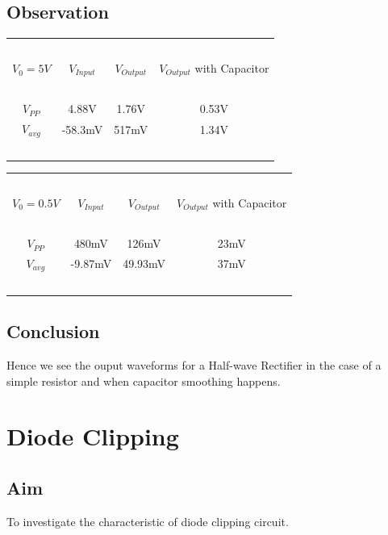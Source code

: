\documentclass{article}
\begin{document}
\subsection{Observation}
\vspace{5px}
\begin{center}
\begin{tabular}{| c | c | c | c |} 
 \hline
    \ & \ & \ & \ \\
    $V_0=5V$ &$V_{Input}$ & $V_{Output}$ & $V_{Output}$ with Capacitor \\ [1em]
    \hline
    \ & \ & \ & \ \\
    $V_{PP}$ & 4.88V & 1.76V & 0.53V \\
    $V_{avg}$ & -58.3mV & 517mV & 1.34V \\
    \ & \ & \ & \ \\
 \hline
\end{tabular}
\end{center}
\vspace{5px}
\begin{center}
\begin{tabular}{| c | c | c | c |} 
 \hline
    \ & \ & \ & \ \\
    $V_0=0.5V$ &$V_{Input}$ & $V_{Output}$ & $V_{Output}$ with Capacitor \\ [1em]
    \hline
    \ & \ & \ & \ \\
    $V_{PP}$ & 480mV & 126mV & 23mV \\
    $V_{avg}$ & -9.87mV & 49.93mV & 37mV \\
    \ & \ & \ & \ \\
 \hline
\end{tabular}
\end{center}

\subsection{Conclusion}
Hence we see the ouput waveforms for a Half-wave Rectifier in the case of a simple resistor and when capacitor smoothing happens.

\vspace{20px}
\section{Diode Clipping}
\subsection{Aim}
To investigate the characteristic of diode clipping circuit.
\end{document}
